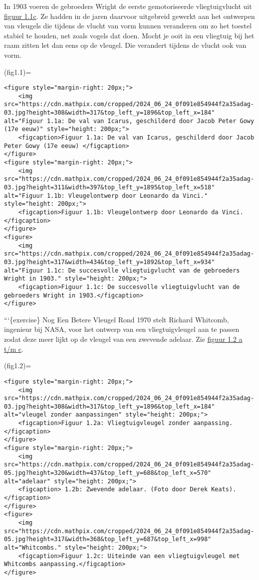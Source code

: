 In 1903 voeren de gebroeders Wright de eerste gemotoriseerde
vliegtuigvlucht uit \href{fig1.1}{figuur 1.1c}. Ze hadden in de jaren
daarvoor uitgebreid gewerkt aan het ontwerpen van vleugels die tijdens
de vlucht van vorm kunnen veranderen om zo het toestel stabiel te
houden, net zoals vogels dat doen. Mocht je ooit in een vliegtuig bij
het raam zitten let dan eens op de vleugel. Die verandert tijdens de
vlucht ook van vorm.

(fig1.1)=

\begin{verbatim}
<figure style="margin-right: 20px;">
    <img src="https://cdn.mathpix.com/cropped/2024_06_24_0f091e854944f2a35adag-03.jpg?height=308&width=317&top_left_y=1896&top_left_x=184" alt="Figuur 1.1a: De val van Icarus, geschilderd door Jacob Peter Gowy (17e eeuw)" style="height: 200px;">
    <figcaption>Figuur 1.1a: De val van Icarus, geschilderd door Jacob Peter Gowy (17e eeuw) </figcaption>
</figure>
<figure style="margin-right: 20px;">
    <img src="https://cdn.mathpix.com/cropped/2024_06_24_0f091e854944f2a35adag-03.jpg?height=311&width=397&top_left_y=1895&top_left_x=518" alt="Figuur 1.1b: Vleugelontwerp door Leonardo da Vinci." style="height: 200px;">
    <figcaption>Figuur 1.1b: Vleugelontwerp door Leonardo da Vinci.</figcaption>
</figure>
<figure>
    <img src="https://cdn.mathpix.com/cropped/2024_06_24_0f091e854944f2a35adag-03.jpg?height=317&width=434&top_left_y=1892&top_left_x=934" alt="Figuur 1.1c: De succesvolle vliegtuigvlucht van de gebroeders Wright in 1903." style="height: 200px;">
    <figcaption>Figuur 1.1c: De succesvolle vliegtuigvlucht van de gebroeders Wright in 1903.</figcaption>
</figure>
\end{verbatim}

```\{exercise\} Nog Een Betere Vleugel Rond 1970 stelt Richard Whitcomb,
ingenieur bij NASA, voor het ontwerp van een vliegtuigvleugel aan te
passen zodat deze meer lijkt op de vleugel van een zwevende adelaar. Zie
\href{fig1.2}{figuur 1.2 a t/m c}.

(fig1.2)=

\begin{verbatim}
<figure style="margin-right: 20px;">
    <img src="https://cdn.mathpix.com/cropped/2024_06_24_0f091e854944f2a35adag-03.jpg?height=308&width=317&top_left_y=1896&top_left_x=184" alt="vleugel zonder aanpassingen" style="height: 200px;">
    <figcaption>Figuur 1.2a: Vliegtuigvleugel zonder aanpassing.</figcaption>
</figure>
<figure style="margin-right: 20px;">
    <img src="https://cdn.mathpix.com/cropped/2024_06_24_0f091e854944f2a35adag-05.jpg?height=320&width=437&top_left_y=688&top_left_x=570" alt="adelaar" style="height: 200px;">
    <figcaption> 1.2b: Zwevende adelaar. (Foto door Derek Keats).</figcaption>
</figure>
<figure>
    <img src="https://cdn.mathpix.com/cropped/2024_06_24_0f091e854944f2a35adag-05.jpg?height=317&width=368&top_left_y=687&top_left_x=998" alt="Whitcombs." style="height: 200px;">
    <figcaption>Figuur 1.2c: Uiteinde van een vliegtuigvleugel met Whitcombs aanpassing.</figcaption>
</figure>
\end{verbatim}

